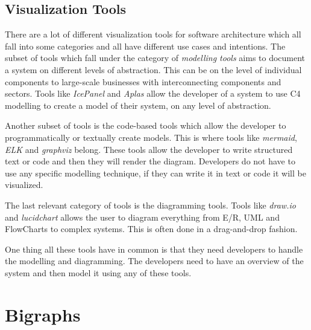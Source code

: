 \subsection{Visualization Tools}
There are a lot of different visualization tools for software architecture which all fall into some categories and all have different use cases and intentions.
The subset of tools which fall under the category of \textit{modelling tools} aims to document a system on different levels of abstraction. This can be on the level of individual components to large-scale businesses with interconnecting components and sectors.
Tools like \textit{IcePanel} and \textit{Aplas} allow the developer of a system to use C4 modelling to create a model of their system, on any level of abstraction.

Another subset of tools is the code-based tools which allow the developer to programmatically or textually create models. This is where tools like \textit{mermaid}, \textit{ELK} and \textit{graphviz} belong.
These tools allow the developer to write structured text or code and then they will render the diagram. Developers do not have to use any specific modelling technique, if they can write it in text or code it will be visualized.

The last relevant category of tools is the diagramming tools. Tools like \textit{draw.io} and \textit{lucidchart} allows the user to diagram everything from E/R, UML and FlowCharts to complex systems.
This is often done in a drag-and-drop fashion.

One thing all these tools have in common is that they need developers to handle the modelling and diagramming. The developers need to have an overview of the system and then model it using any of these tools.

\section{Bigraphs}